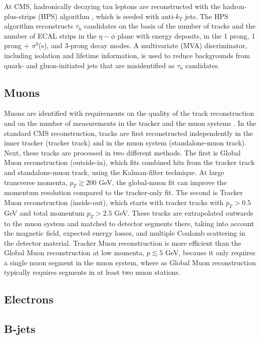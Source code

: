 \documentclass{article}
\begin{document}
At CMS, hadronically decaying tau leptons are reconstructed with the hadron-plus-strips (HPS) algorithm \cite{CMS-TAU-14-001}, which is seeded with anti-$k_T$ jets. The HPS algorithm reconstructs $\tau_{h}$ candidates on the basis of the number of tracks and the number of ECAL strips in the $\eta-\phi$ plane with energy deposits, in the 1 prong, 1 prong + $\pi^0$(s), and 3-prong decay modes. A multivariate (MVA) discriminator, including isolation and lifetime information, is used to reduce backgrounds from quark- and gluon-initiated jets that are misidentified as $\tau_{h}$ candidates. 

\subsection{Muons}
Muons are identified with requirements on the quality of the track reconstruction and on the number of measurements in the tracker and the muon systems \cite{CMS-MUO-10-004}. In the standard CMS reconstruction, tracks are first reconstructed independently in the inner tracker (tracker track) and in the muon system (standalone-muon track). Next, these tracks are processed in two different methods. The first is Global Muon reconstruction (outside-in), which fits combined hits from the tracker track and standalone-muon track, using the Kalman-filter technique. At large transverse momenta, $p_{T} \gtrsim 200$ GeV, the global-muon fit can improve the momentum resolution compared to the tracker-only fit.  The second is Tracker Muon reconstruction (inside-out), which starts with tracker tracks with $p_{T} > 0.5$ GeV and total momentum $p_{T} > 2.5$ GeV. These tracks are extrapolated outwards to the muon system and matched to detector segments there, taking into account the magnetic field, expected energy losses, and multiple Coulomb scattering in the detector material. Tracker Muon reconstruction is more efficient than the Global Muon reconstruction at low momenta, $p \lesssim 5$ GeV, because it only requires a single muon segment in the muon system, where as Global Muon reconstruction typically requires segments in at least two muon stations.

\subsection{Electrons}


\subsection{B-jets}


\printbibheading
\printbibliography
\end{document}
